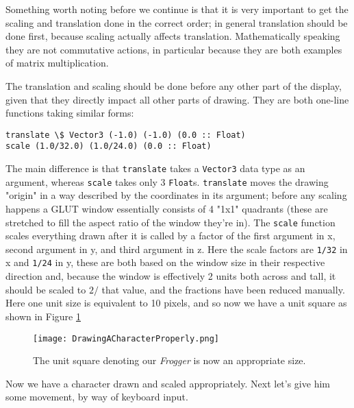 \documentclass[12pt, a4paper]{report}
\begin{document}
\par

Something worth noting before we continue is that it is very important to get the scaling and translation done in the correct order; in general translation should be done first, because scaling actually affects translation.
Mathematically speaking they are not commutative actions, in particular because they are both examples of matrix multiplication.

\par

The translation and scaling should be done before any other part of the display, given that they directly impact all other parts of drawing.
They are both one-line functions taking similar forms:

\begin{lstlisting}
translate \$ Vector3 (-1.0) (-1.0) (0.0 :: Float)
scale (1.0/32.0) (1.0/24.0) (0.0 :: Float)
\end{lstlisting}

The main difference is that \verb|translate| takes a \verb|Vector3| data type as an argument, whereas \verb|scale| takes only 3 \verb|Float|s.
\verb|translate| moves the drawing "origin" in a way described by the coordinates in its argument; before any scaling happens a GLUT window essentially consists of 4 "1x1" quadrants (these are stretched to fill the aspect ratio of the window they're in).
The \verb|scale| function scales everything drawn after it is called by a factor of the first argument in x, second argument in y, and third argument in z.
Here the scale factors are \verb|1/32| in x and \verb|1/24| in y, these are both based on the window size in their respective direction and, because the window is effectively 2 units both across and tall, it should be scaled to $2/$ that value, and the fractions have been reduced manually.
Here one unit size is equivalent to 10 pixels, and so now we have a unit square as shown in Figure \ref{fig:drawingacharacterproperly}

\begin{figure}[ht]
  \centering
  \caption{The unit square denoting our \textit{Frogger} is now an appropriate size.}
  \texttt{[image: DrawingACharacterProperly.png]}
  \label{fig:drawingacharacterproperly}
\end{figure}

Now we have a character drawn and scaled appropriately.
Next let's give him some movement, by way of keyboard input.
\end{document}
